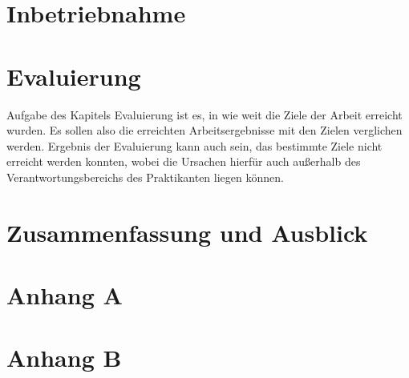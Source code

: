 \documentclass[oneside]{ausarbeitung}
\begin{document}
\chapter{Inbetriebnahme}
\label{cha:inbetriebnahme}


\chapter{Evaluierung}
\label{cha:evaluierung}

Aufgabe des Kapitels Evaluierung ist es, in wie weit die Ziele der 
Arbeit erreicht wurden. Es sollen also die erreichten Arbeitsergebnisse 
mit den Zielen verglichen werden. Ergebnis der Evaluierung kann auch 
sein, das bestimmte Ziele nicht erreicht werden konnten, wobei die 
Ursachen hierfür auch außerhalb des Verantwortungsbereichs des 
Praktikanten liegen können.

\chapter{Zusammenfassung und Ausblick}
\label{cha:zusammenfassung}


\appendix

\printbibliography[heading=bibintoc]

\chapter{Anhang A}

\chapter{Anhang B}
\end{document}
